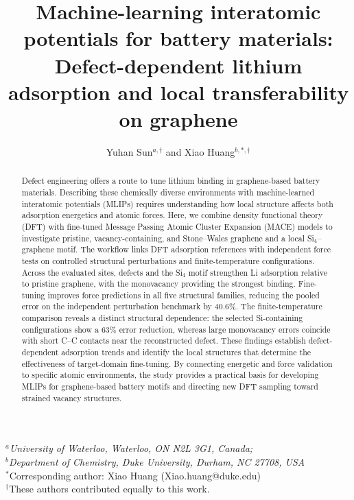 \documentclass[12pt]{article}
\title{Machine-learning interatomic potentials for battery materials: Defect-dependent lithium adsorption and local transferability on graphene}
\author{Yuhan Sun$^{a,\dagger}$ and Xiao Huang$^{b,*,\dagger}$}
\date{}
\begin{document}
\linenumbers

\maketitle
\begin{center}
    \textit{$^{a}$University of Waterloo, Waterloo, ON N2L 3G1, Canada;\\
    $^{b}$Department of Chemistry, Duke University, Durham, NC 27708, USA}\\
    $^*$Corresponding author: Xiao Huang (Xiao.huang@duke.edu)\\
    $^\dagger$These authors contributed equally to this work.
\end{center}

\begin{abstract}
Defect engineering offers a route to tune lithium binding in graphene-based
battery materials. Describing these chemically diverse environments with
machine-learned interatomic potentials (MLIPs) requires understanding how
local structure affects both adsorption energetics and atomic forces.
Here, we combine density functional theory (DFT) with fine-tuned Message
Passing Atomic Cluster Expansion (MACE) models to investigate pristine,
vacancy-containing, and Stone--Wales graphene and a local Si$_4$--graphene
motif. The workflow links DFT adsorption references with independent force
tests on controlled structural perturbations and finite-temperature
configurations. Across the evaluated sites, defects and the Si$_4$ motif
strengthen Li adsorption relative to pristine graphene, with the monovacancy
providing the strongest binding. Fine-tuning improves force predictions in
all five structural families, reducing the pooled error on the independent
perturbation benchmark by 40.6\%. The finite-temperature comparison reveals
a distinct structural dependence: the selected Si-containing configurations
show a 63\% error reduction, whereas large monovacancy errors coincide with
short C--C contacts near the reconstructed defect. These findings establish
defect-dependent adsorption trends and identify the local structures that
determine the effectiveness of target-domain fine-tuning. By connecting
energetic and force validation to specific atomic environments, the study
provides a practical basis for developing MLIPs for graphene-based battery
motifs and directing new DFT sampling toward strained vacancy structures.
\end{abstract}
\end{document}
